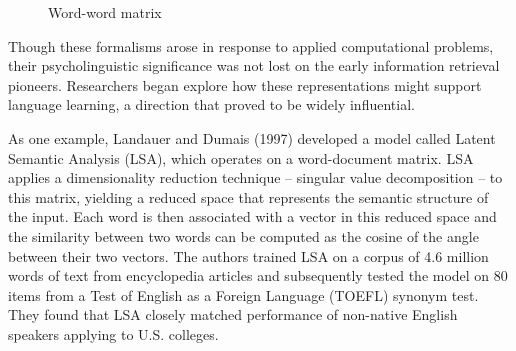 \documentclass[man,floatsintext]{apa6}
\begin{document}
\begin{figure}
  \begin{center}
    \footnotesize{}
    \caption{Word-word matrix}
    \label{matrix-word-word}
  \end{center}
\end{figure}

Though these formalisms arose in response to applied computational problems, their psycholinguistic significance was not lost on the early information retrieval pioneers. Researchers began explore how these representations might support language learning, a direction that proved to be widely influential.

As one example, Landauer and Dumais (1997) developed a model called Latent Semantic Analysis (LSA), which operates on a word-document matrix. LSA applies a dimensionality reduction technique -- singular value decomposition -- to this matrix, yielding a reduced space that represents the semantic structure of the input. Each word is then associated with a vector in this reduced space and the similarity between two words can be computed as the cosine of the angle between their two vectors. The authors trained LSA on a corpus of 4.6 million words of text from encyclopedia articles and subsequently tested the model on 80 items from a Test of English as a Foreign Language (TOEFL) synonym test. They found that LSA closely matched performance of non-native English speakers applying to U.S. colleges. 
\end{document}

